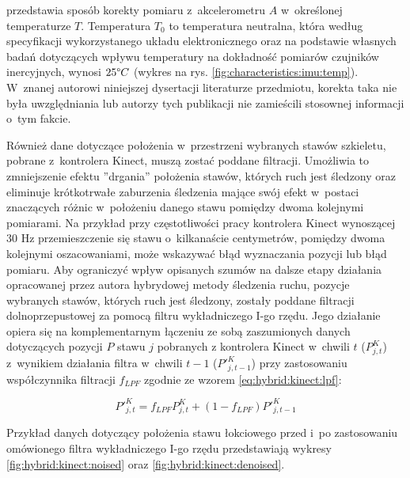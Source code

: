 przedstawia sposób korekty pomiaru z~akcelerometru  $A$ w~określonej temperaturze $T$. Temperatura $T_0$ to temperatura neutralna, która według specyfikacji wykorzystanego układu elektronicznego oraz na podstawie własnych badań dotyczących wpływu temperatury na dokładność pomiarów czujników inercyjnych, wynosi $25\degree C$ (wykres na rys. \ref{fig:characteristics:imu:temp}). W~znanej autorowi niniejszej dysertacji literaturze przedmiotu, korekta taka nie była uwzględniania lub autorzy tych publikacji nie zamieścili stosownej informacji o~tym fakcie.
						
Również dane dotyczące położenia w~przestrzeni wybranych stawów szkieletu, pobrane z~kontrolera Kinect, muszą zostać poddane filtracji. Umożliwia to zmniejszenie efektu ''drgania'' położenia stawów, których ruch jest śledzony oraz eliminuje krótkotrwałe zaburzenia śledzenia mające swój efekt w~postaci znaczących różnic w~położeniu danego stawu pomiędzy dwoma kolejnymi pomiarami. Na przykład przy częstotliwości pracy kontrolera Kinect wynoszącej 30 Hz przemieszczenie się stawu o~kilkanaście centymetrów, pomiędzy dwoma kolejnymi oszacowaniami, może wskazywać błąd wyznaczania pozycji lub błąd pomiaru. Aby ograniczyć wpływ opisanych szumów na dalsze etapy działania opracowanej przez autora hybrydowej metody śledzenia ruchu, pozycje wybranych stawów, których ruch jest śledzony, zostały poddane filtracji dolnoprzepustowej za pomocą filtru wykładniczego I-go rzędu. Jego działanie opiera się na komplementarnym łączeniu ze sobą zaszumionych danych dotyczących pozycji $P$ stawu $j$ pobranych z kontrolera Kinect w~chwili $t$ ($P^K_{j,t}$) z~wynikiem działania filtra w~chwili $t-1$ ($P'^K_{j,t-1}$) przy zastosowaniu współczynnika filtracji $f_{LPF}$ zgodnie ze wzorem \ref{eq:hybrid:kinect:lpf}:

\begin{equation}
	\label{eq:hybrid:kinect:lpf}
	P'^K_{j,t} = f_{LPF} P^K_{j,t} + (1-f_{LPF})P'^K_{j,t-1}
\end{equation}

Przykład danych dotyczący położenia stawu łokciowego przed i~po zastosowaniu omówionego filtra wykładniczego I-go rzędu przedstawiają wykresy \ref{fig:hybrid:kinect:noised} oraz \ref{fig:hybrid:kinect:denoised}.
						
